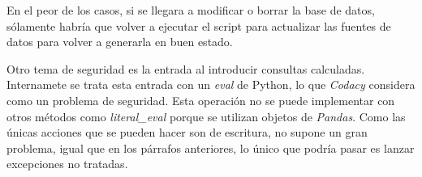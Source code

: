 En el peor de los casos, si se llegara a modificar o borrar la base de datos, sólamente habría que volver a ejecutar el script para actualizar las fuentes de datos para volver a generarla en buen estado.

Otro tema de seguridad es la entrada al introducir consultas calculadas. Internamete se trata esta entrada con un \textit{eval} de Python, lo que \textit{Codacy} considera como un problema de seguridad. Esta operación no se puede implementar con otros métodos como \textit{literal\_eval} porque se utilizan objetos de \textit{Pandas}. Como las únicas acciones que se pueden hacer son de escritura, no supone un gran problema, igual que en los párrafos anteriores, lo único que podría pasar es lanzar excepciones no tratadas.
